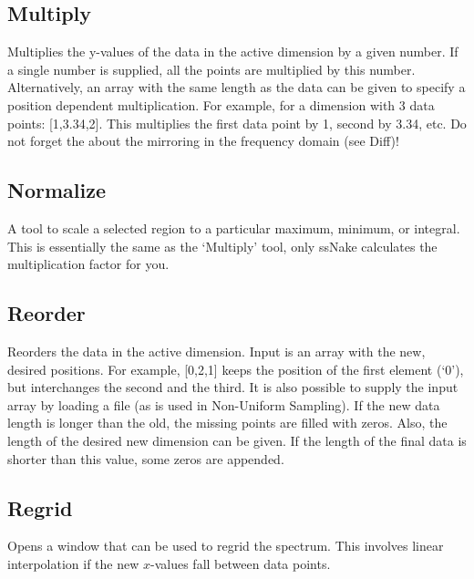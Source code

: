 \documentclass[11pt,a4paper]{article}
\begin{document}
\subsection{Multiply}
Multiplies the y-values of the data in the active dimension by a given number.
If a single number is supplied, all the points are multiplied by this number.
Alternatively, an array with the same length as the data can be given to specify a position dependent multiplication.
For example, for a dimension with 3 data points: [1,3.34,2].
This multiplies the first data point by 1, second by 3.34, etc.
Do not forget the about the mirroring in the frequency domain (see Diff)!

\subsection{Normalize}
A tool to scale a selected region to a particular maximum, minimum, or integral.
This is essentially the same as the `Multiply' tool, only ssNake calculates the multiplication factor for you.

\subsection{Reorder}
Reorders the data in the active dimension.
Input is an array with the new, desired positions.
For example, [0,2,1] keeps the position of the first element (`0'), but interchanges the second and the third.
It is also possible to supply the input array by loading a file (as is used in Non-Uniform Sampling).
If the new data length is longer than the old, the missing points are filled with zeros.
Also, the length of the desired new dimension can be given.
If the length of the final data is shorter than this value, some zeros are appended.

\subsection{Regrid}
Opens a window that can be used to regrid the spectrum.
This involves linear interpolation if the new $x$-values fall between data points.

\end{document}
